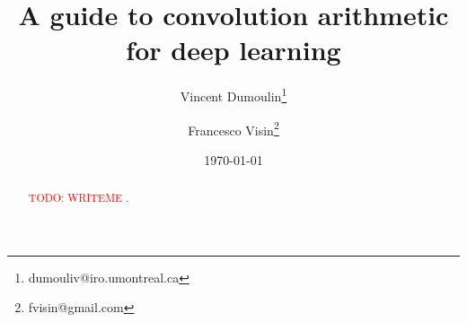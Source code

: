 \documentclass{article}
\title{A guide to convolution arithmetic for deep learning}
\author[1]{Vincent Dumoulin\thanks{dumouliv@iro.umontreal.ca}}
\author[1]{Francesco Visin\thanks{fvisin@gmail.com}}
\affil[1]{MILA, Universit\'{e} de Montr\'{e}al}
\date{\today}
\newcommand{\todo}[1]{\textcolor{red}{TODO: #1}}
\begin{document}
\maketitle

\begin{abstract}
\todo{WRITEME} \cite{lecun1998gradient}.
\end{abstract}



\end{document}
